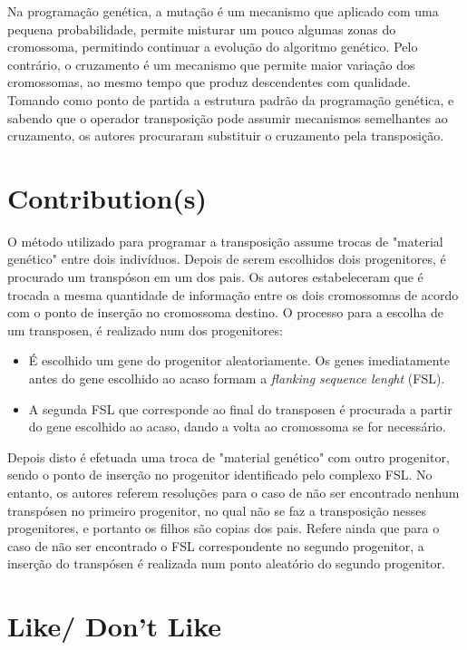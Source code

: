 \documentclass[12pt,portuguese,a4paper]{article}
\begin{document}
Na programação genética, a mutação é um mecanismo que aplicado com uma pequena probabilidade, permite misturar um pouco algumas zonas do cromossoma, permitindo continuar a evolução do algoritmo genético. Pelo contrário, o cruzamento é um mecanismo que permite maior variação dos cromossomas, ao mesmo tempo que produz descendentes com qualidade.  Tomando como ponto de partida a estrutura padrão da programação genética, e sabendo que o operador transposição pode assumir mecanismos semelhantes ao cruzamento, os autores procuraram substituir o cruzamento pela transposição.

\section{Contribution(s)}

O método utilizado para programar a transposição assume trocas de "material genético" entre dois indivíduos.
Depois de serem escolhidos dois progenitores, é procurado um transpóson em um dos pais.
Os autores estabeleceram que é trocada a mesma quantidade de informação entre os dois cromossomas de acordo com o ponto de inserção no cromossoma destino.
O processo para a escolha de um transposen, é realizado num dos progenitores:
\begin{itemize}
    \item É escolhido um gene do progenitor aleatoriamente. Os genes imediatamente antes do gene escolhido ao acaso formam a \textit{flanking sequence lenght} (FSL).
    \item A segunda FSL que corresponde ao final do transposen é procurada a partir do gene escolhido ao acaso, dando a volta ao cromossoma se for necessário.
\end{itemize}
Depois disto é efetuada uma troca de "material genético" com outro progenitor, sendo o ponto de inserção no progenitor identificado pelo complexo FSL.
No entanto, os autores referem resoluções para o caso de não ser encontrado nenhum transpósen no primeiro progenitor, no qual não se faz a transposição nesses progenitores, e portanto os filhos são copias dos pais. Refere ainda que para o caso de não ser encontrado o FSL correspondente no segundo progenitor, a inserção do transpósen é realizada num ponto aleatório do segundo progenitor.

\section{Like/ Don't Like}




\end{document}
